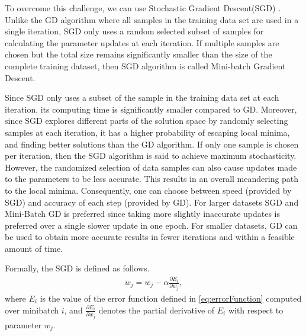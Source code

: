 \documentclass[conference]{IEEEtran}
\begin{document}
To overcome this challenge, we can use Stochastic Gradient Descent(SGD) \cite{bottou2010large}. Unlike the GD algorithm where all samples in the training data set are used in a single iteration, SGD only uses a random 
selected subset of samples for calculating the parameter updates at each iteration. 
If multiple samples are chosen but the total size remains significantly smaller than the size of the complete
training dataset, then SGD algorithm is called Mini-batch Gradient Descent.


Since SGD only uses a subset of the sample in the training data set at each iteration, its computing time is
significantly smaller compared to GD.  Moreover, since SGD explores different parts of the solution space by randomly selecting samples
at each iteration, it has a higher probability of escaping local minima, and finding better solutions than the GD algorithm. 
If only one sample is chosen per iteration, then the SGD algorithm is said to achieve maximum
stochasticity. However,
the randomized selection of data samples can also cause updates made to the parameters to be less accurate. This results in an overall
meandering path to the local minima. Consequently, one can choose between speed (provided by SGD) and accuracy of each step (provided by
GD). For larger datasets SGD and Mini-Batch GD is preferred since taking more slightly inaccurate updates is preferred over a
single slower update in one epoch. For smaller datasets, GD can be used to obtain more accurate results in fewer iterations and within
a feasible amount of time. 


Formally, the SGD is defined as follows.
\begin{align}\label{eq:GD}
w_j = w_j -\alpha \frac{\partial E_i}{\partial w_j}, 
\end{align}
where $E_i$ is the value of the error function defined in \ref{eq:errorFunction} computed over
minibatch $i$, and  $\frac{\partial E_i}{\partial w_j}$ denotes the partial derivative of $E_i$ with respect to parameter $w_j$. 
 

\end{document}
